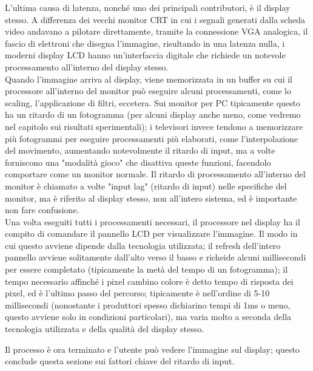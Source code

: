 L'ultima causa di latenza, nonché uno dei principali contributori, è il display stesso. A differenza dei vecchi monitor CRT in cui i segnali generati dalla scheda video andavano a pilotare direttamente, tramite la connessione VGA analogica, il fascio di elettroni che disegna l'immagine, risultando in una latenza nulla, i moderni display LCD hanno un'interfaccia digitale che richiede un notevole processamento all'interno del display stesso.\\
Quando l'immagine arriva al display, viene memorizzata in un buffer su cui il processore all'interno del monitor può eseguire alcuni processamenti, come lo scaling, l'applicazione di filtri, eccetera. Sui monitor per PC tipicamente questo ha un ritardo di un fotogramma (per alcuni display anche meno, come vedremo nel capitolo sui risultati sperimentali); i televisori invece tendono a memorizzare più fotogrammi per eseguire processamenti più elaborati, come l'interpolazione del movimento, aumentando notevolmente il ritardo di input, ma a volte forniscono una "modalità gioco" che disattiva queste funzioni, facendolo comportare come un monitor normale. Il ritardo di processamento all'interno del monitor è chiamato a volte "input lag" (ritardo di input) nelle specifiche del monitor, ma è riferito al display stesso, non all'intero sistema, ed è importante non fare confusione.\\
Una volta eseguiti tutti i processamenti necessari, il processore nel display ha il compito di comandare il pannello LCD per visualizzare l'immagine. Il modo in cui questo avviene dipende dalla tecnologia utilizzata; il refresh dell'intero pannello avviene solitamente dall'alto verso il basso e richeide alcuni millisecondi per essere completato (tipicamente la metà del tempo di un fotogramma); il tempo necessario affinché i pixel cambino colore è detto tempo di risposta dei pixel, ed è l'ultimo passo del percorso; tipicamente è nell'ordine di 5-10 millisecondi (nonostante i produttori spesso dichiarino tempi di 1ms o meno, questo avviene solo in condizioni particolari), ma varia molto a seconda della tecnologia utilizzata e della qualità del display stesso.

Il processo è ora terminato e l'utente può vedere l'immagine sul display; questo conclude questa sezione sui fattori chiave del ritardo di input.
